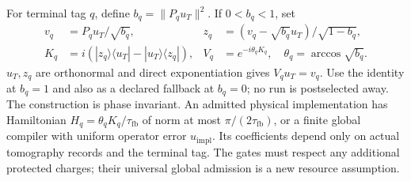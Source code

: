 \documentclass[11pt,oneside,openany]{book}
\theoremstyle{definition}
\theoremstyle{remark}\newtheorem{remark}[theorem]{Remark}
\begin{document}
For terminal tag $q$, define $b_q=\|P_qu_T\|^2$. If $0<b_q<1$,
set
\begin{align}
 v_q&=P_qu_T/\sqrt{b_q},&
 z_q&=(v_q-\sqrt{b_q}u_T)/\sqrt{1-b_q},\nonumber\\
 K_q&=i(|z_q\rangle\langle u_T|-|u_T\rangle\langle z_q|),&
 V_q&=e^{-i\theta_qK_q},\quad\theta_q=\arccos\sqrt{b_q}.
                                                        \label{copy:repair-gate}
\end{align}
$u_T,z_q$ are orthonormal and direct exponentiation gives
$V_qu_T=v_q$. Use the identity at $b_q=1$ and also as a declared
fallback at $b_q=0$; no run is postselected away. The construction is
phase invariant. An admitted physical implementation has Hamiltonian
$H_q=\theta_qK_q/\tau_{\mathrm{fb}}$ of norm at most
$\pi/(2\tau_{\mathrm{fb}})$, or a finite global compiler with
uniform operator error $u_{\mathrm{impl}}$. Its coefficients depend
only on actual tomography records and the terminal tag. The gates
must respect any additional protected charges; their universal global
admission is a new resource assumption.
\end{document}
